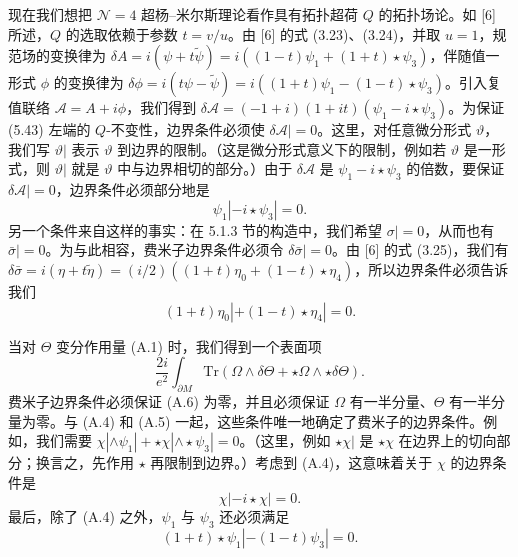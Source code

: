 \documentclass[11pt,a4paper,UTF8]{ctexart}
\theoremstyle{plain}
\theoremstyle{definition}
\begin{document}
现在我们想把 $\mathcal{N}=4$ 超杨–米尔斯理论看作具有拓扑超荷 $Q$ 的拓扑场论。如 [6] 所述，$Q$ 的选取依赖于参数 $t=v/u$。由 [6] 的式 (3.23)、(3.24)，并取 $u=1$，规范场的变换律为 $\delta A=i(\psi+t\tilde\psi)=i((1-t)\psi_1+(1+t)\star\psi_3)$，伴随值一形式 $\phi$ 的变换律为 $\delta\phi=i(t\psi-\tilde\psi)=i((1+t)\psi_1-(1-t)\star\psi_3)$。引入复值联络 $\mathcal{A}=A+i\phi$，我们得到 $\delta\mathcal{A}=(-1+i)(1+it)(\psi_1-i\star\psi_3)$。为保证 (5.43) 左端的 $Q$-不变性，边界条件必须使 $\delta\mathcal{A}|=0$。这里，对任意微分形式 $\vartheta$，我们写 $\vartheta|$ 表示 $\vartheta$ 到边界的限制。（这是微分形式意义下的限制，例如若 $\vartheta$ 是一形式，则 $\vartheta|$ 就是 $\vartheta$ 中与边界相切的部分。）由于 $\delta\mathcal{A}$ 是 $\psi_1-i\star\psi_3$ 的倍数，要保证 $\delta\mathcal{A}|=0$，边界条件必须部分地是
\begin{equation}
    \psi_1|-i\star\psi_3|=0 .
    \tag{A.4}
\end{equation}
另一个条件来自这样的事实：在 5.1.3 节的构造中，我们希望 $\sigma|=0$，从而也有 $\bar\sigma|=0$。为与此相容，费米子边界条件必须令 $\delta\bar\sigma|=0$。由 [6] 的式 (3.25)，我们有 $\delta\bar\sigma=i(\eta+t\tilde\eta)=(i/2)((1+t)\eta_0+(1-t)\star\eta_4)$，所以边界条件必须告诉我们
\begin{equation}
    (1+t)\eta_0|+(1-t)\star\eta_4|=0 .
    \tag{A.5}
\end{equation}


当对 $\Theta$ 变分作用量 (A.1) 时，我们得到一个表面项
\begin{equation}
    \frac{2i}{e^2}\int_{\partial M}\mathrm{Tr}\left(\Omega\wedge\delta\Theta+\star\Omega\wedge\star\delta\Theta\right).
    \tag{A.6}
\end{equation}
费米子边界条件必须保证 (A.6) 为零，并且必须保证 $\Omega$ 有一半分量、$\Theta$ 有一半分量为零。与 (A.4) 和 (A.5) 一起，这些条件唯一地确定了费米子的边界条件。例如，我们需要 $\chi|\wedge\psi_1|+\star\chi|\wedge\star\psi_3|=0$。（这里，例如 $\star\chi|$ 是 $\star\chi$ 在边界上的切向部分；换言之，先作用 $\star$ 再限制到边界。）考虑到 (A.4)，这意味着关于 $\chi$ 的边界条件是
\begin{equation}
    \chi|-i\star\chi|=0 .
    \tag{A.7}
\end{equation}
最后，除了 (A.4) 之外，$\psi_1$ 与 $\psi_3$ 还必须满足
\begin{equation}
    (1+t)\star\psi_1|-(1-t)\psi_3|=0 .
    \tag{A.8}
\end{equation}
\end{document}

